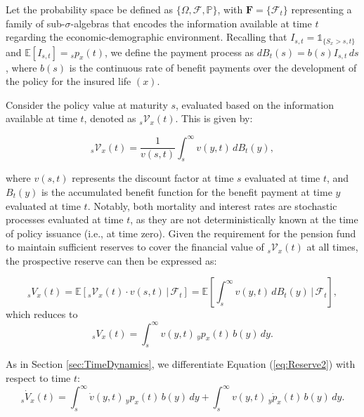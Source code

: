 \documentclass[12pt]{article}
\begin{document}
{Let the probability space be defined as \( \{\Omega, \mathcal{F}, \mathbb{P}\} \), with \(\textbf{F} = \{\mathcal{F}_t\}\) representing a family of sub-\(\sigma\)-algebras that encodes the information available at time \( t \) regarding the economic-demographic environment. Recalling that \( I_{s,t} = \mathds{1}_{\{S_x > s, t\}} \) and \( \mathbb{E}[I_{s,t}] = {}_s p_x(t) \), we define the payment process as \( dB_t(s) = b(s) I_{s,t} \, ds \), where \( b(s) \) is the continuous rate of benefit payments over the development of the policy for the insured life \( (x) \).


Consider the policy value at maturity \( s \), evaluated based on the information available at time \( t \), denoted as \({}_s\mathcal{V}_x(t)\). This is given by:

\[
{}_s\mathcal{V}_x(t) = \frac{1}{v(s, t)} \int_s^{\infty} v(y, t) \, dB_t(y),
\]

where \( v(s, t) \) represents the discount factor at time \( s \) evaluated at time \( t \), and \( B_t(y) \) is the accumulated benefit function for the benefit payment at time \( y \) evaluated at time \( t \). Notably, both mortality and interest rates are stochastic processes evaluated at time \( t \), as they are not deterministically known at the time of policy issuance (i.e., at time zero). Given the requirement for the pension fund to maintain sufficient reserves to cover the financial value of \({}_s\mathcal{V}_x(t)\) at all times, the prospective reserve can then be expressed as:

\begin{equation}\label{eq:Reserve1}
	{}_sV_x(t) = \mathbb{E}[{}_s\mathcal{V}_x(t) \cdot v(s,t) \,|\, \mathcal{F}_t] = \mathbb{E} \left[ \int_s^\infty v(y,t) \, dB_t(y) \,|\, \mathcal{F}_t \right],
\end{equation}
which reduces to
\begin{equation}\label{eq:Reserve2}
	{}_sV_x(t) = \int_s^\infty v(y,t) \, {}_yp_x(t) \, b(y) \, dy.
\end{equation}

As in Section \ref{sec:TimeDynamics}, we differentiate Equation (\ref{eq:Reserve2}) with respect to time $t$:
\begin{equation}\label{eq:DifferentiateReserveT}
	{}_s\dot{V}_x(t) = \int_s^\infty \dot{v}(y,t) \, {}_yp_x(t) \, b(y) \, dy + \int_s^\infty v(y,t) \, {}_y\dot{p}_x(t) \, b(y) \, dy.
\end{equation}

}
\end{document}
